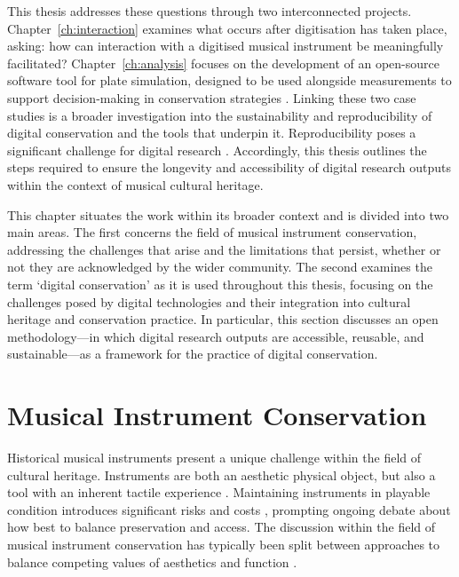 This thesis addresses these questions through two interconnected projects.
Chapter~\ref{ch:interaction} examines what occurs after digitisation has taken
place, asking: how can interaction with a digitised musical instrument be
meaningfully facilitated? Chapter~\ref{ch:analysis} focuses on the development
of an open-source software tool for plate simulation, designed to be used
alongside measurements to support decision-making in conservation strategies
\cite{barclay_care_1997}. Linking these two case studies is a broader
investigation into the sustainability and reproducibility of digital
conservation and the tools that underpin it. Reproducibility poses a significant
challenge for digital research \cite{perkel_challenge_2020}. Accordingly, this
thesis outlines the steps required to ensure the longevity and accessibility of
digital research outputs
\cite{soito_citations_2016,smith_software_2016,katz_recognizing_2021,stall_journal_2023}
within the context of musical cultural heritage.

This chapter situates the work within its broader context and is divided into
two main areas. The first concerns the field of musical instrument conservation,
addressing the challenges that arise and the limitations that persist, whether
or not they are acknowledged by the wider community. The second examines the
term `digital conservation' as it is used throughout this thesis, focusing on
the challenges posed by digital technologies and their integration into cultural
heritage and conservation practice. In particular, this section discusses an
open methodology---in which digital research outputs are accessible, reusable,
and sustainable---as a framework for the practice of digital conservation.

\section{Musical Instrument Conservation}

Historical musical instruments present a unique challenge within the field of
cultural heritage. Instruments are both an aesthetic physical object, but also a
tool with an inherent tactile experience \cite{charalampos_role_2018}.
Maintaining instruments in playable condition introduces significant risks and
costs \cite{lamb_play_2007}, prompting ongoing debate about how best to balance
preservation and access. The discussion within the field of musical instrument
conservation has typically been split between approaches to balance competing
values of aesthetics and function \cite{barclay_care_1997,
barclay_preservation_2005}. 


